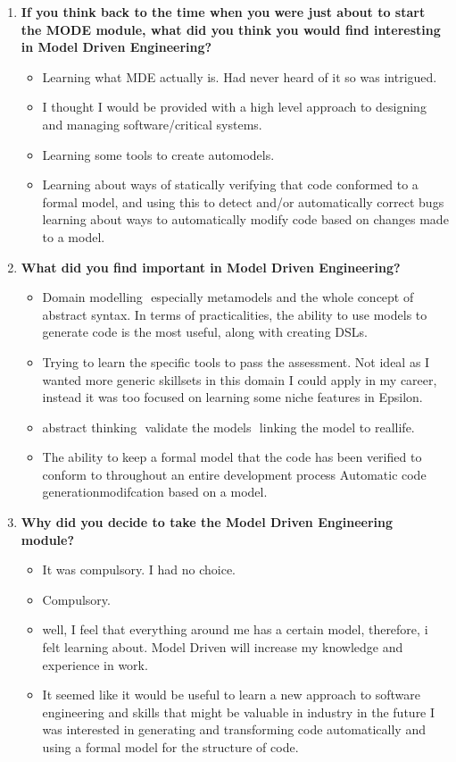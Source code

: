 \documentclass[12pt, a4paper]{report}
\begin{document}
\begin{appendices}
\begin{enumerate}
\item \textbf{If you think back to the time when you were just about to start the MODE module, what did you think you would find interesting in Model ­Driven Engineering?}
\begin{itemize}
\item Learning what MDE actually is. Had never heard of it so was intrigued.
\item I thought I would be provided with a high level approach to designing and managing software/critical systems.
\item Learning some tools to create auto­models.
\item Learning about ways of statically verifying that code conformed to a formal model, and using this to detect and/or automatically correct bugs learning about ways to automatically modify code based on changes made to a model.
\end{itemize}

\item \textbf{What did you find important in Model­ Driven Engineering?}
\begin{itemize}
\item Domain modelling ­ especially metamodels and the whole concept of abstract syntax. In terms of practicalities, the ability to use models to generate code is the most useful, along with creating DSLs.
\item Trying to learn the specific tools to pass the assessment. Not ideal as I wanted more generic
skillsets in this domain I could apply in my career, instead it was too focused on learning some niche features in Epsilon.
\item abstract thinking ­ validate the models ­ linking the model to real­life.
\item The ability to keep a formal model that the code has been verified to conform to throughout
an entire development process Automatic code generationmodifcation based on a model.
\end{itemize}

\item \textbf{ Why did you decide to take the Model ­Driven Engineering module?}
\begin{itemize}
\item It was compulsory. I had no choice.
\item Compulsory.
\item well, I feel that everything around me has a certain model, therefore, i felt learning about. Model­ Driven will increase my knowledge and experience in work. 
\item It seemed like it would be useful to learn a new approach to software engineering and skills that might be valuable in industry in the future I was interested in generating and transforming code automatically and using a formal model for the structure of code.
\end{itemize}



\end{enumerate}
\end{appendices}
\end{document}
